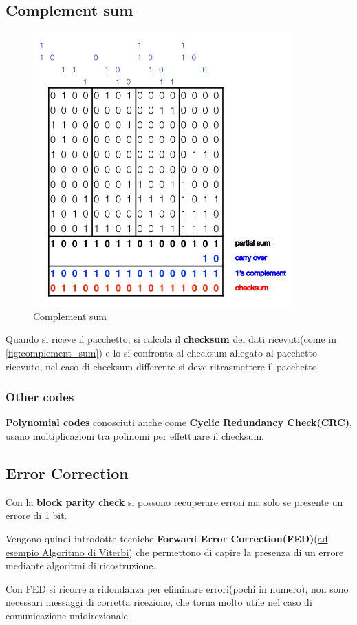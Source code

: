 \subsection{Complement sum}

\begin{figure}[!ht]
	\centering
	\includegraphics[width=0.4\columnwidth]{./images/complement_sum.png}
	\caption{Complement sum}
	\label{fig:complement_sum}
\end{figure}

Quando si riceve il pacchetto, si calcola il \textbf{checksum} dei dati ricevuti(come in \autoref{fig:complement_sum})
e lo si confronta al checksum allegato al pacchetto ricevuto,
nel caso di checksum differente si deve ritrasmettere il pacchetto.

\subsubsection{Other codes}

\textbf{Polynomial codes} conosciuti anche come \textbf{Cyclic Redundancy Check(CRC)},
usano moltiplicazioni tra polinomi per effettuare il checksum.



\subsection{Error Correction}



Con la \textbf{block parity check} si possono recuperare errori ma solo se presente un errore di 1 bit.

Vengono quindi introdotte tecniche \textbf{Forward Error Correction(FED)}(\href{https://en.wikipedia.org/wiki/Viterbi_algorithm}{ad esempio Algoritmo di Viterbi})
che permettono di capire la presenza di un errore mediante algoritmi di ricostruzione.

Con FED si ricorre a ridondanza per eliminare errori(pochi in numero), non sono necessari messaggi
di corretta ricezione, che torna molto utile nel caso di comunicazione unidirezionale.


